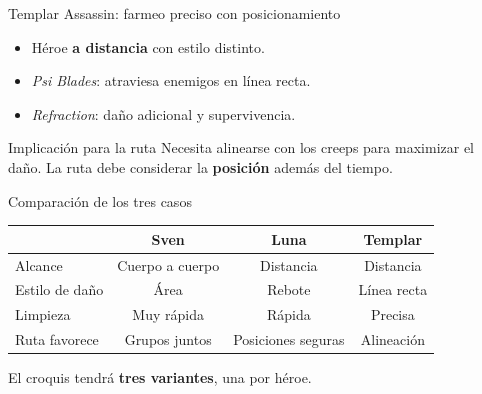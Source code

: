 \begin{frame}{Templar Assassin: farmeo preciso con posicionamiento}
  \begin{itemize}
    \item Héroe \textbf{a distancia} con estilo distinto.
    \item \textit{Psi Blades}: atraviesa enemigos en línea recta.
    \item \textit{Refraction}: daño adicional y supervivencia.
  \end{itemize}
  \vspace{0.5em}
  \begin{block}{Implicación para la ruta}
    Necesita alinearse con los creeps para maximizar el daño. La ruta debe considerar la \textbf{posición} además del tiempo.
  \end{block}
\end{frame}

\begin{frame}{Comparación de los tres casos}
  \begin{center}
    \begin{tabular}{lccc}
      \toprule
      & \textbf{Sven} & \textbf{Luna} & \textbf{Templar} \\
      \midrule
      Alcance        & Cuerpo a cuerpo & Distancia & Distancia \\
      Estilo de daño & Área            & Rebote    & Línea recta \\
      Limpieza       & Muy rápida      & Rápida    & Precisa \\
      Ruta favorece  & Grupos juntos   & Posiciones seguras & Alineación \\
      \bottomrule
    \end{tabular}
  \end{center}
  \vspace{0.5em}
  \begin{center}
    El croquis tendrá \textbf{tres variantes}, una por héroe.
  \end{center}
\end{frame}